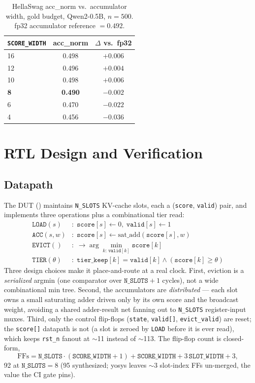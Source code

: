 \documentclass[10pt,twocolumn]{article}
\begin{document}
\begin{table}[tbp]
\centering
\caption{HellaSwag acc\_norm vs.\ accumulator width, gold budget,
  Qwen2-0.5B, $n{=}500$. fp32 accumulator reference $= 0.492$.}
\label{tab:scorewidth}
\small
\begin{tabular}{lcc}
\toprule
\texttt{SCORE\_WIDTH} & acc\_norm & $\Delta$ vs.\ fp32 \\
\midrule
16 & 0.498 & $+0.006$ \\
12 & 0.496 & $+0.004$ \\
10 & 0.498 & $+0.006$ \\
\textbf{8} & \textbf{0.490} & $\mathbf{-0.002}$ \\
6  & 0.470 & $-0.022$ \\
4  & 0.456 & $-0.036$ \\
\bottomrule
\end{tabular}
\end{table}

\section{RTL Design and Verification}
\label{sec:rtl}

\subsection{Datapath}

The DUT () maintains \texttt{N\_SLOTS}
KV-cache slots, each a (\texttt{score}, \texttt{valid}) pair, and implements three
operations plus a combinational tier read:
\begin{align*}
\texttt{LOAD}(s)   &:\; \texttt{score}[s]\leftarrow0,\;\texttt{valid}[s]\leftarrow1 \\
\texttt{ACC}(s, w) &:\; \texttt{score}[s]\leftarrow\mathrm{sat\_add}(\texttt{score}[s], w) \\
\texttt{EVICT}()   &:\; \rightarrow\arg\min_{k:\,\texttt{valid}[k]}\texttt{score}[k] \\
\texttt{TIER}(\theta) &:\; \texttt{tier\_keep}[k]=\texttt{valid}[k]\wedge(\texttt{score}[k]\ge\theta)
\end{align*}
Three design choices make it place-and-route at a real clock. First, eviction is a
\emph{serialized} argmin (one comparator over $\texttt{N\_SLOTS}+1$ cycles), not a
wide combinational min tree. Second, the accumulators are \emph{distributed} ---
each slot owns a small saturating adder driven only by its own score and the
broadcast weight, avoiding a shared adder-result net fanning out to
\texttt{N\_SLOTS} register-input muxes. Third, only the control flip-flops
(\texttt{state}, \texttt{valid[]}, \texttt{evict\_valid}) are reset; the
\texttt{score[]} datapath is not (a slot is zeroed by \texttt{LOAD} before it is
ever read), which keeps \texttt{rst\_n} fanout at $\sim$11 instead of $\sim$113.
The flip-flop count is closed-form,
\[
  \mathrm{FFs}=\texttt{N\_SLOTS}\cdot(\texttt{SCORE\_WIDTH}{+}1)+\texttt{SCORE\_WIDTH}+3\,\texttt{SLOT\_WIDTH}+3,
\]
92 at $\texttt{N\_SLOTS}{=}8$ (95 synthesized; yosys leaves $\sim$3 slot-index FFs
un-merged, the value the CI gate pins).
\end{document}
